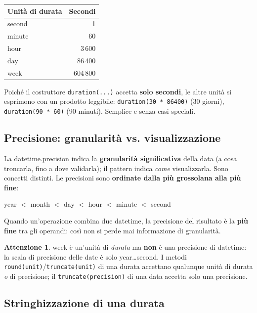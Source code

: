 \documentclass[11pt,a4paper]{book}
\let\code\lstinline
\newcommand{\ic}[1]{{\ttfamily #1}}
\theoremstyle{definition}
\newtheorem*{attenzione}{Attenzione}
\begin{document}
{{{{\begin{center}
\small
\begin{tabular}{@{}l r@{}}
\toprule
\textbf{Unità di durata} & \textbf{Secondi} \\
\midrule
\ic{second} & 1 \\
\ic{minute} & 60 \\
\ic{hour} & 3\,600 \\
\ic{day} & 86\,400 \\
\ic{week} & 604\,800 \\
\bottomrule
\end{tabular}
\end{center}

Poiché il costruttore \code|duration(...)| accetta \textbf{solo secondi}, le altre
unità si esprimono con un prodotto leggibile: \code|duration(30 * 86400)| (30
giorni), \code|duration(90 * 60)| (90 minuti). Semplice e senza casi speciali.

\subsection{Precisione: granularità vs. visualizzazione}

La \ic{datetime.precision} indica la \textbf{granularità significativa} della data
(a cosa troncarla, fino a dove validarla); il \ic{pattern} indica \emph{come}
visualizzarla. Sono concetti distinti. Le precisioni sono \textbf{ordinate dalla
più grossolana alla più fine}:

\begin{center}
\ic{year} $<$ \ic{month} $<$ \ic{day} $<$ \ic{hour} $<$ \ic{minute} $<$ \ic{second}
\end{center}

Quando un'operazione combina due \ic{datetime}, la precisione del risultato è la
\textbf{più fine} tra gli operandi: così non si perde mai informazione di
granularità.

\begin{attenzione}
\ic{week} è un'unità di \emph{durata} ma \textbf{non} è una precisione di
\ic{datetime}: la scala di precisione delle date è solo
\ic{year}\ldots\ic{second}. I metodi \code|round(unit)|/\code|truncate(unit)| di
una durata accettano qualunque unità di durata \emph{o} di precisione; il
\code|truncate(precision)| di una data accetta solo una precisione.
\end{attenzione}

\subsection{Stringhizzazione di una durata}

}}}}
\end{document}
